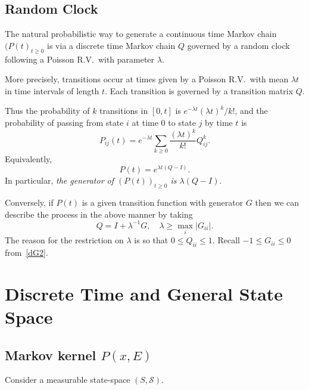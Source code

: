 \documentclass[a4paper]{amsart}
\theoremstyle{plain}
\theoremstyle{definition}
\theoremstyle{remark}
\begin{document}
\subsection{Random Clock} \label{secrc} The natural probabilistic way to generate   a continuous time Markov chain $ (P(t)_{t\geq 0} $ is via a discrete time Markov chain $ Q $ governed by a random clock following a Poisson R.V.\  with parameter $ \lambda $.

\medskip More precisely, transitions occur at times given by a Poisson R.V.\ with mean $ \lambda t $ in time intervals of length $ t $.
Each transition is governed by a transition matrix $ Q $.

Thus the probability of $ k $ transitions in $ [0,t] $ is $ e^{- \lambda t } ( \lambda t )^k / k! $, and the probability of passing from state $  i $ at time $ 0 $ to state $ j $ by time $ t $ is
\begin{equation} \label{}
P_{ij}(t) = e^{-\lambda t }  \sum_{k\geq 0} \frac{(\lambda t)^k}{k!} Q_{ij}^k.
\end{equation}
Equivalently, 
\begin{equation} \label{}
P(t) = e^{\lambda t (Q-I)}.
\end{equation}
In particular, \emph{the generator of $ (P(t))_{t\geq 0 } $ is $ \lambda (Q-I) $}.

\medskip Conversely, if $ P(t) $ is a given transition function with generator $ G $  then we can describe the process in the above manner by taking  
\begin{equation} \label{}
Q = I + \lambda ^{-1} G, \quad \lambda \geq \max_i |G_{ii} |.
\end{equation}
The reason for the restriction on $ \lambda $ is so that  $ 0 \leq Q_{ii} \leq 1 $.  Recall $ -1 \leq G_{ii} \leq 0 $
from~\eqref{dG2}.

\section{\textbf{Discrete Time and General State Space}}



\subsection{Markov kernel $ P(x,E) $}

Consider a measurable state-space $ ( S, \mathcal{S} ) $.
\end{document}
